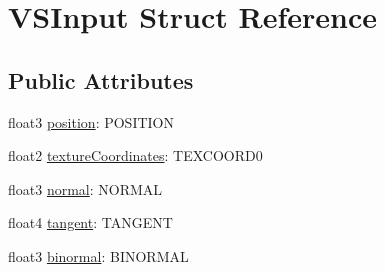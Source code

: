 \hypertarget{struct_v_s_input}{
\section{VSInput Struct Reference}
\label{struct_v_s_input}
}
\subsection*{Public Attributes}
\begin{DoxyCompactItemize}
\item 
float3 \hyperlink{struct_v_s_input_aed491629cd84dfab85cf7183f180e91b}{position}: POSITION
\item 
float2 \hyperlink{struct_v_s_input_a30e05320d62b757f513169849d45410f}{textureCoordinates}: TEXCOORD0
\item 
float3 \hyperlink{struct_v_s_input_a35455e47d232796105794746b83411a2}{normal}: NORMAL
\item 
float4 \hyperlink{struct_v_s_input_ae40739bf6da27046f3de2cf11d37a23a}{tangent}: TANGENT
\item 
float3 \hyperlink{struct_v_s_input_aef4a4114e46e037f6b4d624da7915e7c}{binormal}: BINORMAL
\end{DoxyCompactItemize}



